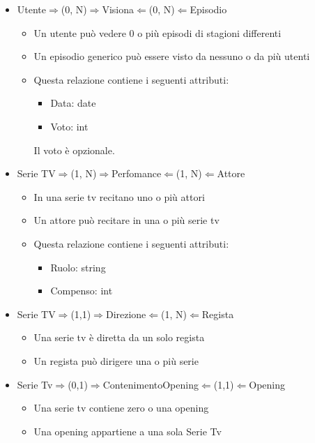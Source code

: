 \documentclass[12pt,a4paper]{article}
\begin{document}
\begin{itemize}
\begin{itemize}
    \end{itemize}\newpage
    \item Utente$\Rightarrow$(0, N)$\Rightarrow$Visiona$\Leftarrow$(0, N)$\Leftarrow$Episodio
    \begin{itemize}
        \item Un utente può vedere 0 o più episodi di stagioni differenti
        \item Un episodio generico può essere visto da nessuno o da più utenti
        \item Questa relazione contiene i seguenti attributi:
        \begin{itemize}
            \item Data: date
            \item Voto: int
        \end{itemize}
        Il voto è opzionale.
    \end{itemize}
    \item Serie TV$\Rightarrow$(1, N)$\Rightarrow$Perfomance$\Leftarrow$(1, N)$\Leftarrow$Attore
    \begin{itemize}
            \item In una serie tv recitano uno o più attori
            \item Un attore può recitare in una o più serie tv
            \item Questa relazione contiene i seguenti attributi:
            \begin{itemize}
                \item Ruolo: string
                \item Compenso: int
        \end{itemize}
    \end{itemize}
    \item Serie TV$\Rightarrow$(1,1)$\Rightarrow$Direzione$\Leftarrow$(1, N)$\Leftarrow$Regista 
    \begin{itemize}
        \item Una serie tv è diretta da un solo regista 
        \item Un regista può dirigere una o più serie 
    \end{itemize}
    \item Serie Tv$\Rightarrow$(0,1)$\Rightarrow$ContenimentoOpening$\Leftarrow$(1,1)$\Leftarrow$Opening
    \begin{itemize}
        \item Una serie tv contiene zero o una opening
        \item Una opening appartiene a una sola Serie Tv 
    \end{itemize} 
\end{itemize}
\end{document}

